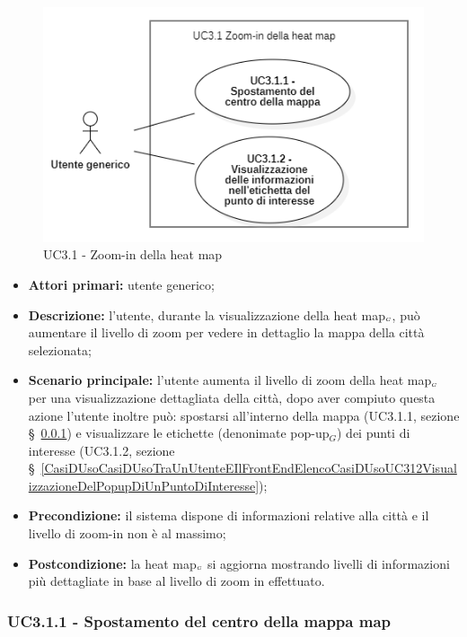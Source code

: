 \begin{center}
	\begin{figure}[H]
		\centering\includegraphics[scale=0.8]{../immagini/attori_casi/UC3.1.png}
		\caption{UC3.1 - Zoom-in della heat map}
	\end{figure}
\end{center}

\begin{itemize}
	\item \textbf{Attori primari:} utente generico;
	\item \textbf{Descrizione:} l’utente, durante la visualizzazione della heat map$_{\scaleto{G}{3pt}}$, può aumentare il livello di zoom per vedere in dettaglio la mappa della città selezionata;
	\item \textbf{Scenario principale:} l’utente aumenta il livello di zoom della heat map$_{\scaleto{G}{3pt}}$ per una visualizzazione dettagliata della città, dopo aver compiuto questa azione l'utente inoltre può: spostarsi all'interno della mappa (UC3.1.1, sezione \S~\ref{CasiDUsoCasiDUsoTraUnUtenteEIlFrontEndElencoCasiDUsoUC311SpostamentoDelCentroDellaMappa}) e visualizzare le etichette (denonimate pop-up$_G$) dei punti di interesse (UC3.1.2, sezione \S~\ref{CasiDUsoCasiDUsoTraUnUtenteEIlFrontEndElencoCasiDUsoUC312VisualizzazioneDelPopupDiUnPuntoDiInteresse});
	\item \textbf{Precondizione:} il sistema dispone di informazioni relative alla città e il livello di zoom-in non è al massimo;
	\item \textbf{Postcondizione:} la heat map$_{\scaleto{G}{3pt}}$ si aggiorna mostrando livelli di informazioni più dettagliate in base al livello di zoom in effettuato.
\end{itemize}

\subsubsection{UC3.1.1 - Spostamento del centro della mappa map}\label{CasiDUsoCasiDUsoTraUnUtenteEIlFrontEndElencoCasiDUsoUC311SpostamentoDelCentroDellaMappa}

